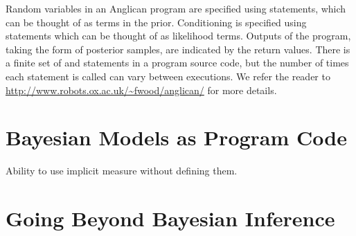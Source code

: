 Random variables in an Anglican program are specified using \sample statements, which can be thought of as terms in the prior. Conditioning is specified using \observe statements which can be thought of as likelihood terms.  Outputs of the program, taking the form of posterior samples, are indicated by the return values.  There is a finite set of \sample and \observe statements in a program source code, but the number of times each statement is called can vary between executions.  We refer the reader to  \href{http://www.robots.ox.ac.uk/~fwood/anglican/}{\small\url{http://www.robots.ox.ac.uk/~fwood/anglican/}} for more details.

\section{Bayesian Models as Program Code}
\label{sec:probprog:models}


Ability to use implicit measure without defining them.


\section{Going Beyond Bayesian Inference}
\label{sec:probprog:limit}

